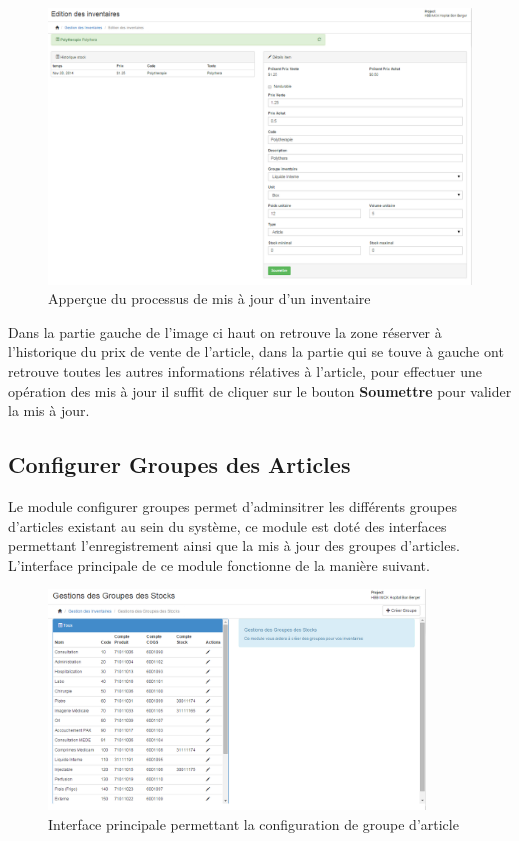 \documentclass[12pt,a4paper]{report}
\begin{document}
\begin{figure}[h]
\begin{center}
\includegraphics[width=14cm]{pic/GestInventareUpdt.png}
\end{center}
\caption{Apperçue du processus de mis à jour d'un inventaire}
\label{Apperçue du processus de mis à jour d'un inventaire}
\end{figure}

Dans la partie gauche de l'image ci haut on retrouve la zone réserver à l'historique du prix de vente de l'article, dans la partie qui se touve à gauche ont retrouve toutes les autres informations rélatives à l'article, pour effectuer une opération des mis à jour il suffit de cliquer sur le bouton \textbf{Soumettre} pour valider la mis à jour. 

\newpage
\subsection{Configurer Groupes des Articles}
Le module configurer groupes permet d'adminsitrer les différents groupes d'articles existant au sein du système, ce module est doté des interfaces permettant l'enregistrement ainsi que la mis à jour des groupes d'articles. L'interface principale de ce module fonctionne de la manière suivant.

\begin{figure}[h]
\begin{center}
\includegraphics[width=10cm]{pic/GroupeMedicament.png}
\end{center}
\caption{Interface principale permettant la configuration de groupe d'article}
\label{Interface principale permettant la configuration de groupe d'article}
\end{figure}
\end{document}
